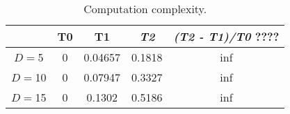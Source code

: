 \begin{table}[ht]
\centering
\caption{ Computation complexity. }
\label{tab:AlgComp}
\begin{tabular}{ccccc}
\hline
  & T0 & T1 & {\it T2} & {\it (T2 - T1)/T0} ???? \\
\hline
$D=$5 & 0 & 0.04657 & 0.1818 & inf \\
$D=$10 & 0 & 0.07947 & 0.3327 & inf \\
$D=$15 & 0 & 0.1302 & 0.5186 & inf \\
\hline
\hline
\end{tabular}
\end{table}

